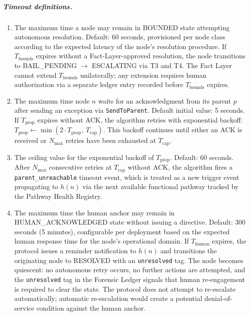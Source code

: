 \subparagraph{Timeout definitions.}

\begin{enumerate}
\item[\textbf{$T_{\text{bounds}}$ — Bounds Engine resolution timeout.}] The maximum time a node may remain in BOUNDED state attempting autonomous resolution. Default: 60 seconds, provisioned per node class according to the expected latency of the node's resolution procedure. If $T_{\text{bounds}}$ expires without a Fact-Layer-approved resolution, the node transitions to BAIL\_PENDING $\rightarrow$ ESCALATING via T3 and T4. The Fact Layer cannot extend $T_{\text{bounds}}$ unilaterally; any extension requires human authorization via a separate ledger entry recorded before $T_{\text{bounds}}$ expires.

\item[\textbf{$T_{\text{prop}}$ — Per-hop propagation timeout.}] The maximum time node $n$ waits for an acknowledgment from its parent $p$ after sending an exception via \texttt{SendToParent}. Default initial value: 5 seconds. If $T_{\text{prop}}$ expires without ACK, the algorithm retries with exponential backoff: $T_{\text{prop}} \leftarrow \min(2 \cdot T_{\text{prop}},\ T_{\text{cap}})$. This backoff continues until either an ACK is received or $N_{\max}$ retries have been exhausted at $T_{\text{cap}}$.

\item[\textbf{$T_{\text{cap}}$ — Maximum propagation timeout value.}] The ceiling value for the exponential backoff of $T_{\text{prop}}$. Default: 60 seconds. After $N_{\max}$ consecutive retries at $T_{\text{cap}}$ without ACK, the algorithm fires a \texttt{parent\_unreachable} timeout event, which is treated as a new trigger event propagating to $h(n)$ via the next available functional pathway tracked by the Pathway Health Registry.

\item[\textbf{$T_{\text{human}}$ — Human acknowledgment timeout.}] The maximum time the human anchor may remain in HUMAN\_ACKNOWLEDGED state without issuing a directive. Default: 300 seconds (5 minutes), configurable per deployment based on the expected human response time for the node's operational domain. If $T_{\text{human}}$ expires, the protocol issues a reminder notification to $h(n)$ and transitions the originating node to RESOLVED with an \texttt{unresolved} tag. The node becomes quiescent: no autonomous retry occurs, no further actions are attempted, and the \texttt{unresolved} tag in the Forensic Ledger signals that human re-engagement is required to clear the state. The protocol does not attempt to re-escalate automatically; automatic re-escalation would create a potential denial-of-service condition against the human anchor.
\end{enumerate}

